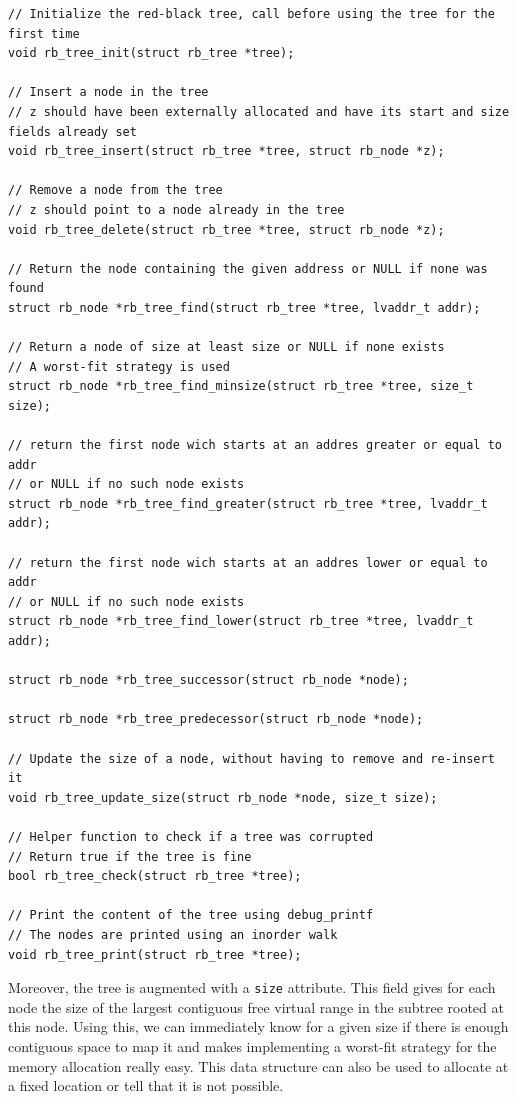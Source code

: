 \begin{lstlisting}[caption={Functions availables in the red-black tree},label={listing:shadow_pt}]
// Initialize the red-black tree, call before using the tree for the first time
void rb_tree_init(struct rb_tree *tree);

// Insert a node in the tree
// z should have been externally allocated and have its start and size fields already set
void rb_tree_insert(struct rb_tree *tree, struct rb_node *z);

// Remove a node from the tree
// z should point to a node already in the tree
void rb_tree_delete(struct rb_tree *tree, struct rb_node *z);

// Return the node containing the given address or NULL if none was found
struct rb_node *rb_tree_find(struct rb_tree *tree, lvaddr_t addr);

// Return a node of size at least size or NULL if none exists
// A worst-fit strategy is used
struct rb_node *rb_tree_find_minsize(struct rb_tree *tree, size_t size);

// return the first node wich starts at an addres greater or equal to addr
// or NULL if no such node exists
struct rb_node *rb_tree_find_greater(struct rb_tree *tree, lvaddr_t addr);

// return the first node wich starts at an addres lower or equal to addr
// or NULL if no such node exists
struct rb_node *rb_tree_find_lower(struct rb_tree *tree, lvaddr_t addr);

struct rb_node *rb_tree_successor(struct rb_node *node);

struct rb_node *rb_tree_predecessor(struct rb_node *node);

// Update the size of a node, without having to remove and re-insert it
void rb_tree_update_size(struct rb_node *node, size_t size);

// Helper function to check if a tree was corrupted
// Return true if the tree is fine
bool rb_tree_check(struct rb_tree *tree);

// Print the content of the tree using debug_printf
// The nodes are printed using an inorder walk
void rb_tree_print(struct rb_tree *tree);

\end{lstlisting}

Moreover, the tree is augmented with a \verb|size| attribute. This field gives for each node the size of the largest contiguous free virtual range in the subtree rooted at this node. Using this, we can immediately know for a given size if there is enough contiguous space to map it and makes implementing a worst-fit strategy for the memory allocation really easy. This data structure can also be used to allocate at a fixed location or tell that it is not possible.

